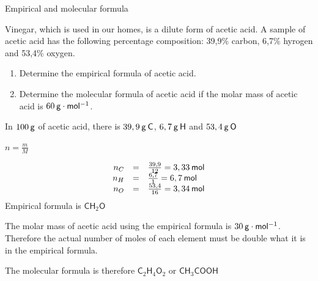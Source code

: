     \noindent
\label{m38712*secfhsst!!!underscore!!!id1308}\vspace{.5cm} 
      \noindent 
      \begin{wex}{Empirical and molecular formula
      }
 {
     \label{m38712*probfhsst!!!underscore!!!id1310}
      \label{m38712*id281533}Vinegar, which is used in our homes, is a dilute form of acetic acid. A sample of acetic acid has the following percentage composition: 39,9\% carbon, 6,7\% hyrogen and 53,4\% oxygen.\par 
      \label{m38712*id281540}\begin{enumerate}[noitemsep, label=\textbf{\arabic*}. ] 
            \leftskip=20pt\rightskip=\leftskip\label{m38712*uid71}\item Determine the empirical formula of acetic acid.
\label{m38712*uid72}\item Determine the molecular formula of acetic acid if the molar mass of acetic acid is $60\phantom{\rule{2pt}{0ex}}\mathsf{g}\ensuremath{\cdot}\mathsf{mol}{}^{-1}$.
\end{enumerate}
      \vspace{5pt}}
{
      \label{m38712*id281607}In $100\phantom{\rule{2pt}{0ex}}\mathsf{g}$ of acetic acid, there is $39,9\phantom{\rule{2pt}{0ex}}\mathsf{g}\phantom{\rule{2pt}{0ex}}\mathsf{C}$, $6,7\phantom{\rule{2pt}{0ex}}\mathsf{g}\phantom{\rule{2pt}{0ex}}\mathsf{H}$ and $53,4\phantom{\rule{2pt}{0ex}}\mathsf{g}\phantom{\rule{2pt}{0ex}}\mathsf{O}$\par 
      \pagebreak
      \label{m38712*id281633}
        $n=\frac{m}{M}$
      \par 
      \label{m38712*id281653}\nopagebreak\noindent{}
        
    \begin{equation}
    \begin{array}{ccc}\hfill {n}_{C}& =& \frac{39,9}{12}=3,33\phantom{\rule{2pt}{0ex}}\mathsf{mol}\hfill \\ \hfill {n}_{H}& =& \frac{6,7}{1}=6,7\phantom{\rule{2pt}{0ex}}\mathsf{mol}\hfill \\ \hfill {n}_{O}& =& \frac{53,4}{16}=3,34\phantom{\rule{2pt}{0ex}}\mathsf{mol}\hfill \end{array}
      \end{equation}
      \label{m38712*id281812}Empirical formula is $\mathsf{CH}{}_{2}\mathsf{O}$\par 
      \label{m38712*id281834}The molar mass of acetic acid using the empirical formula is $30\phantom{\rule{2pt}{0ex}}\mathsf{g}\ensuremath{\cdot}\mathsf{mol}{}^{-1}$. Therefore the actual number of moles of each element must be double what it is in the empirical formula.\par 
      \label{m38712*id281854}The molecular formula is therefore $\mathsf{C}{}_{2}\mathsf{H}{}_{4}\mathsf{O}{}_{2}$ or $\mathsf{CH}{}_{3}\mathsf{COOH}$\par 
}
    \end{wex}
